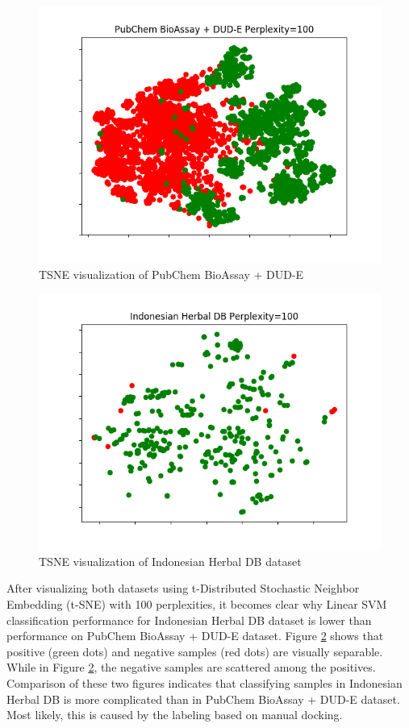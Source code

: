 \documentclass[conference]{IEEEtran}
\begin{document}
\begin{figure}
	\centering
	\includegraphics[scale=0.35]{../images/visualize-dataset_tsne_pubchem_100.png}
	\caption{TSNE visualization of PubChem BioAssay + DUD-E}
	\label{fig_tsne_pubchem}
\end{figure}

\begin{figure}
	\centering	
	\includegraphics[scale=0.35]{../images/visualize-dataset_tsne_herbaldb_expanded_100.png}
	\caption{TSNE visualization of Indonesian Herbal DB dataset}
	\label{fig_tsne_herbaldb}
\end{figure}	

After visualizing both datasets using t-Distributed Stochastic Neighbor Embedding (t-SNE) \cite{maaten2008visualizing} with 100 perplexities, it becomes clear why Linear SVM classification performance for Indonesian Herbal DB dataset is lower than performance on PubChem BioAssay + DUD-E dataset. Figure \ref{fig_tsne_herbaldb} shows that positive (green dots) and negative samples (red dots) are visually separable. While in Figure \ref{fig_tsne_herbaldb}, the negative samples are scattered among the positives. Comparison of these two figures indicates that classifying samples in Indonesian Herbal DB is more complicated than in PubChem BioAssay + DUD-E dataset. Most likely, this is caused by the labeling based on manual docking.
\end{document}
